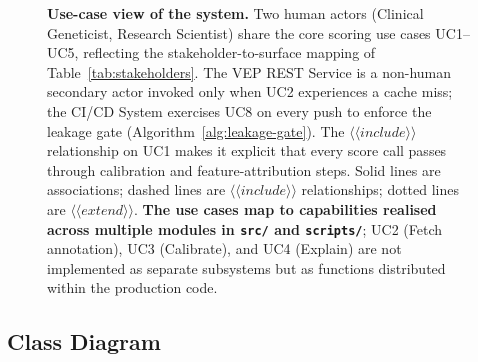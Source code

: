 \documentclass[11pt,a4paper,oneside]{report}
\begin{document}
\begin{figure}[htbp]
{}
\caption[Use case diagram]{\textbf{Use-case view of the
system.} Two human actors (Clinical Geneticist, Research
Scientist) share the core scoring use cases UC1--UC5,
reflecting the stakeholder-to-surface mapping of
Table~\ref{tab:stakeholders}. The \textsc{VEP} REST Service
is a non-human secondary actor invoked only when UC2
experiences a cache miss; the CI/CD System exercises UC8 on
every push to enforce the leakage gate
(Algorithm~\ref{alg:leakage-gate}). The
$\langle\!\langle include\rangle\!\rangle$ relationship on
UC1 makes it explicit that every score call passes through
calibration and feature-attribution steps. Solid lines are
associations; dashed lines are
$\langle\!\langle include\rangle\!\rangle$ relationships;
dotted lines are $\langle\!\langle extend\rangle\!\rangle$.
\textbf{The use cases map to capabilities realised across
multiple modules in \texttt{src/} and \texttt{scripts/}};
UC2 (Fetch annotation), UC3 (Calibrate), and UC4 (Explain)
are not implemented as separate subsystems but as
functions distributed within the production code.}
\label{fig:uc}
\end{figure}

\subsection{Class Diagram}
\label{sec:uml-class}
\end{document}
